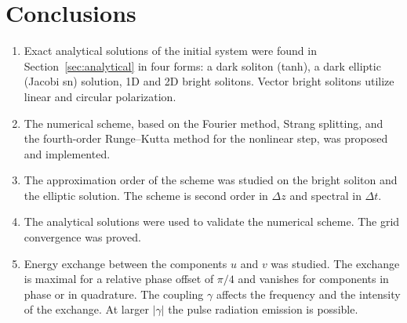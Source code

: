 \documentclass{article}
\begin{document}
    \section{Conclusions}
        \begin{enumerate}
            \item Exact analytical solutions of the initial system were found in Section~\ref{sec:analytical} in four forms: a dark soliton (tanh), a dark elliptic (Jacobi sn) solution, 1D and 2D bright solitons. Vector bright solitons utilize linear and circular polarization.
            \item The numerical scheme, based on the Fourier method, Strang splitting, and the fourth-order Runge–Kutta method for the nonlinear step, was proposed and implemented.
            \item The approximation order of the scheme was studied on the bright soliton and the elliptic solution. The scheme is second order in \(\Delta z\) and spectral in \(\Delta t\).
            \item The analytical solutions were used to validate the numerical scheme. The grid convergence was proved.
            \item Energy exchange between the components \(u\) and \(v\) was studied. The exchange is maximal for a relative phase offset of \(\pi/4\) and vanishes for components in phase or in quadrature. The coupling \(\gamma\) affects the frequency and the intensity of the exchange. At larger \(|\gamma|\) the pulse radiation emission is possible.
        \end{enumerate}
\end{document}
